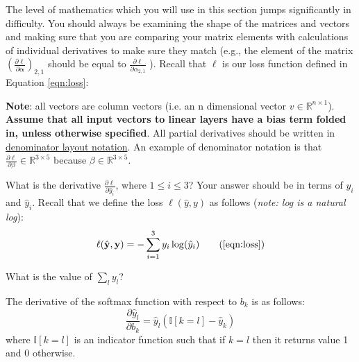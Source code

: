 \documentclass[11pt,addpoints,answers]{exam}
\newcommand{\Ib}{\mathbb{I}}
\newcommand{\yv}{\mathbf{y}}
\begin{document}
\begin{questions}
\begin{parts}
The level of mathematics which you will use in this section jumps significantly in difficulty. You should always be examining the shape of the matrices and vectors and making sure that you are comparing your matrix elements with calculations of individual derivatives to make sure they match (e.g., the element of the matrix $(\frac{\partial \ell}{\partial \boldsymbol{\alpha}})_{2,1}$ should be equal to $\frac{\partial \ell}{\partial \alpha_{2,1}}$  ). Recall that $\ell$ is our loss function defined in Equation \ref{eqn:loss}:

{\bf Note}: all vectors are column vectors (i.e. an n dimensional vector $v \in \mathbb{R}^{n \times 1}$). \textbf{Assume that all input vectors to linear layers have a bias term folded in, unless otherwise specified}. All partial derivatives should be written in \href{https://en.wikipedia.org/wiki/Matrix_calculus#Denominator-layout_notation}{denominator layout notation}. An example of denominator notation is that $\frac{\partial \ell}{\partial \beta} \in \mathbb{R}^{3 \times 5}$ because $\beta \in \mathbb{R}^{3 \times 5}$.

    
\begin{subparts}
    \subpart[1] What is the derivative $\frac{\partial \ell}{\partial \hat{y}_i}$, where $1 \leq i \leq 3$? Your answer should be in terms of $y_i$ and $\hat{y}_i$. Recall that we define the loss $\ell(\hat{y}, y)$ as follows (\textit{note: log is a natural log}):
    \begin{align}
        \ell(\hat{\yv},\yv) = - \sum_{i=1}^3 y_i \log(\hat{y}_i) \tag{\ref{eqn:loss}}
    \end{align}
    
    \begin{your_solution}[title=${\partial \ell}/{\partial \hat{y}_i}$, height=3cm, width=15cm]
    \end{your_solution}
    
    \clearpage

    \subpart[1] What is the value of $\sum_l y_l$?

     \begin{your_solution}[title=${\sum_l y_l}$, height=2.5cm, width=15cm]
    \end{your_solution}

    \subpart[2] The derivative of the softmax function with respect to $b_k$ is as follows:
    \begin{equation}
    \label{eqn:dydbk}
    \frac{\partial \hat{y}_l}{\partial b_k} = \hat{y}_l(\Ib[k=l]-\hat{y}_k)
    \end{equation}
    where $\Ib[k=l]$ is an indicator function such that if $k=l$ then it returns value 1 and 0 otherwise.
    

\end{subparts}
\end{parts}
\end{questions}
\end{document}
